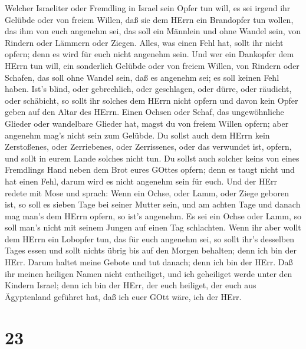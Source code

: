 Welcher Israeliter oder Fremdling in Israel sein Opfer tun will, es sei
irgend ihr Gelübde oder von freiem Willen, daß sie dem HErrn ein
Brandopfer tun wollen, das ihm von euch angenehm sei,  das
soll ein Männlein und ohne Wandel sein, von Rindern oder Lämmern oder
Ziegen.  Alles, was einen Fehl hat, sollt ihr nicht opfern;
denn es wird für euch nicht angenehm sein.  Und wer ein
Dankopfer dem HErrn tun will, ein sonderlich Gelübde oder von freiem
Willen, von Rindern oder Schafen, das soll ohne Wandel sein, daß es
angenehm sei; es soll keinen Fehl haben.  Ist's blind, oder
gebrechlich, oder geschlagen, oder dürre, oder räudicht, oder schäbicht,
so sollt ihr solches dem HErrn nicht opfern und davon kein Opfer geben
auf den Altar des HErrn.  Einen Ochsen oder Schaf, das
ungewöhnliche Glieder oder wandelbare Glieder hat, magst du von freiem
Willen opfern; aber angenehm mag's nicht sein zum Gelübde. 
Du sollst auch dem HErrn kein Zerstoßenes, oder Zerriebenes, oder
Zerrissenes, oder das verwundet ist, opfern, und sollt in eurem Lande
solches nicht tun.  Du sollst auch solcher keins von eines
Fremdlings Hand neben dem Brot eures GOttes opfern; denn es taugt nicht
und hat einen Fehl, darum wird es nicht angenehm sein für euch.
 Und der HErr redete mit Mose und sprach: 
Wenn ein Ochse, oder Lamm, oder Ziege geboren ist, so soll es sieben
Tage bei seiner Mutter sein, und am achten Tage und danach mag man's dem
HErrn opfern, so ist's angenehm.  Es sei ein Ochse oder
Lamm, so soll man's nicht mit seinem Jungen auf einen Tag schlachten.
 Wenn ihr aber wollt dem HErrn ein Lobopfer tun, das für
euch angenehm sei,  so sollt ihr's desselben Tages essen
und sollt nichts übrig bis auf den Morgen behalten; denn ich bin der
HErr.  Darum haltet meine Gebote und tut danach; denn ich
bin der HErr.  Daß ihr meinen heiligen Namen nicht
entheiliget, und ich geheiliget werde unter den Kindern Israel; denn ich
bin der HErr, der euch heiliget,  der euch aus Ägyptenland
geführet hat, daß ich euer GOtt wäre, ich der HErr.

\hypertarget{section-22}{%
\section{23}\label{section-22}}

